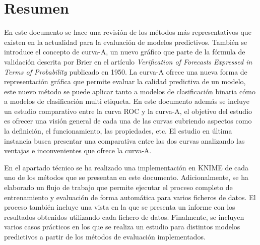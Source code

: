 \thispagestyle{empty}
\section*{Resumen}

En este documento se hace una revisión de los métodos más representativos que existen en la actualidad para la evaluación de modelos predictivos.
También se introduce el concepto de curva-A, un nuevo gráfico que parte de la fórmula de validación descrita por Brier en el artículo \textit{Verification of Forecasts Expressed in Terms of Probability} \cite{brie_1950} publicado en 1950. La curva-A ofrece una nueva forma de representación gráfica que permite evaluar la calidad predictiva de un modelo, este nuevo método se puede aplicar tanto a modelos de clasificación binaria cómo a modelos de clasificación multi etiqueta. En este documento además se incluye un estudio comparativo entre la curva ROC y la curva-A, el objetivo del estudio es ofrecer una visión general de cada una de las curvas cubriendo aspectos como la definición, el funcionamiento, las propiedades, etc. El estudio en última instancia busca presentar una comparativa entre las dos curvas analizando las ventajas e inconvenientes que ofrece la curva-A.

\bigbreak

En el apartado técnico se ha realizado una implementación en KNIME de cada uno de los métodos que se presentan en este documento. Adicionalmente, se ha elaborado un flujo de trabajo que permite ejecutar el proceso completo de entrenamiento y evaluación de forma automática para varios ficheros de datos. El proceso también incluye una vista en la que se presenta un informe con los resultados obtenidos utilizando cada fichero de datos. Finalmente, se incluyen varios casos prácticos en los que se realiza un estudio para distintos modelos predictivos a partir de los métodos de evaluación implementados.

\clearpage
